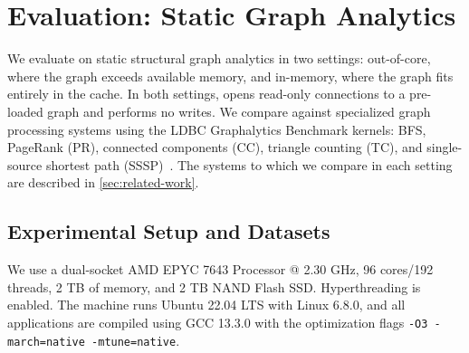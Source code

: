 \chapter{Evaluation: Static Graph Analytics}
\label{sec:eval:static}

We evaluate \project{} on static structural graph analytics in two settings: out-of-core, where the graph exceeds available memory, and in-memory, where the graph fits entirely in the \wt{} cache.
In both settings, \project{} opens read-only connections to a pre-loaded graph and performs no writes.
We compare against specialized graph processing systems using the LDBC Graphalytics Benchmark kernels: BFS, PageRank (PR), connected components (CC), triangle counting (TC), and single-source shortest path (SSSP)~\cite{LDBCGrapalytics22:online}.
The systems to which we compare in each setting are described in \autoref{sec:related-work}.

\section{Experimental Setup and Datasets}
\label{sec:eval:static:setup}

We use a dual-socket AMD EPYC 7643 Processor @ 2.30 GHz, 96 cores/192 threads, 2 TB of memory, and 2 TB NAND Flash SSD.
Hyperthreading is enabled.
The machine runs Ubuntu 22.04 LTS with Linux 6.8.0, and all applications are compiled using GCC 13.3.0 with the optimization flags \texttt{-O3 -march=native -mtune=native}.

